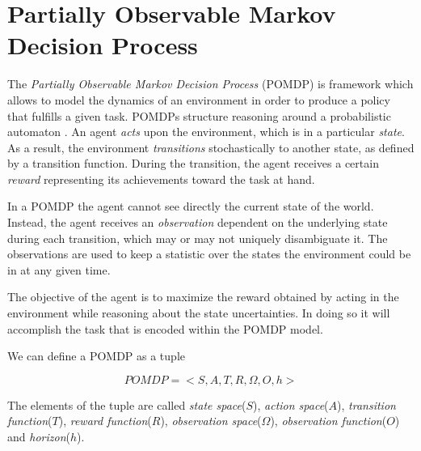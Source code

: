 \section{Partially Observable Markov Decision Process}\label{ref:pomdp}

The \textit{Partially Observable Markov Decision Process} (POMDP) \cite{cit:pomdp} is framework
which allows to model the dynamics of an environment in order to produce a policy that fulfills a
given task. POMDPs structure reasoning around a probabilistic automaton \cite{cit:probautomata}. An
agent \textit{acts} upon the environment, which is in a particular \textit{state}. As a result, the
environment \textit{transitions} stochastically to another state, as defined by a transition
function. During the transition, the agent receives a certain \textit{reward} representing its
achievements toward the task at hand.

In a POMDP the agent cannot see directly the current state of the world. Instead, the agent receives
an \textit{observation} dependent on the underlying state during each transition, which may or may
not uniquely disambiguate it. The observations are used to keep a statistic over the states the
environment could be in at any given time.

The objective of the agent is to maximize the reward obtained by acting in the environment while
reasoning about the state uncertainties. In doing so it will accomplish the task that is encoded
within the POMDP model.

%

We can define a POMDP as a tuple

\begin{equation}
 POMDP = <S,A,T,R,\Omega,O,h>
\end{equation}

The elements of the tuple are called \textit{state space}($S$), \textit{action space}($A$),
\textit{transition function}($T$), \textit{reward function}($R$), \textit{observation
space}($\Omega$), \textit{observation function}($O$) and \textit{horizon}($h$).


